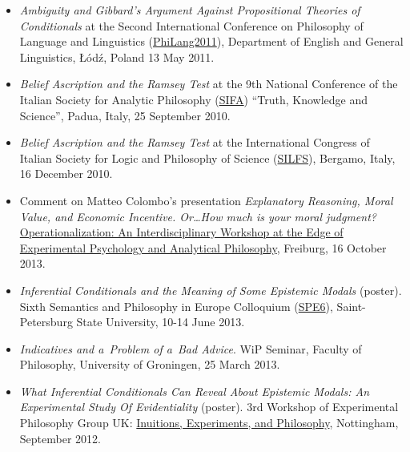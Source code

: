 \documentclass[a4paper,12pt]{article}
\begin{document}
\begin{small}
\begin{itemize}
    \item \emph{Ambiguity and Gibbard's Argument Against Propositional Theories of Conditionals} at the Second International Conference on Philosophy of Language and Linguistics (\href{http://ia.uni.lodz.pl/linguistics/events/philang-2011}{PhiLang2011}),  Department of English and General Linguistics, Łódź, Poland
    13 May 2011. 

    \item \emph{Belief Ascription and the Ramsey Test} at the 9th National Conference of the Italian Society for Analytic Philosophy (\href{http://www.filosofia.lettere.unipd.it/analitica/sifa2010/}{SIFA}) ``Truth, Knowledge and Science'', Padua, Italy, 25 September 2010. 
  
    \item \emph{Belief Ascription and the Ramsey Test} at the International Congress of Italian Society for Logic and Philosophy of Science (\href{http://dinamico2.unibg.it/silfs/convegno2010.htm}{SILFS}), Bergamo, Italy, 16 December 2010. 
  \end{itemize}
  

  \begin{itemize}

  \item Comment on Matteo Colombo's presentation \emph{Explanatory Reasoning, Moral Value, and Economic Incentive. Or\ldots How much is your moral judgment?} 
    \href{http://www.psychologie.uni-freiburg.de/Members/singmann/operational2013}{Operationalization: An Interdisciplinary Workshop at the Edge of Experimental Psychology and Analytical Philosophy}, Freiburg, 16 October 2013.

  \item \emph{Inferential Conditionals and the Meaning of Some
      Epistemic Modals} (poster). Sixth Semantics and Philosophy
    in Europe Colloquium
    (\href{http://spe6conference.wordpress.com}{SPE6}),
    Saint-Petersburg State University, 10-14 June 2013.
    
  \item \emph{Indicatives and a~Problem of a~Bad Advice}. WiP
    Seminar, Faculty of Philosophy, University of Groningen, 25 March
    2013.
    
  \item \emph{What Inferential Conditionals Can Reveal About Epistemic
      Modals: An Experimental Study Of Evidentiality} (poster).
    3rd Workshop of Experimental Philosophy Group UK:
    \href{https://www.nottingham.ac.uk/philosophy/research/conferences/workshop-intuitions-experimentsandphilosophy.aspx}{Inuitions, Experiments, and Philosophy}, Nottingham, September 2012.


\end{itemize}
\end{small}
\end{document}
